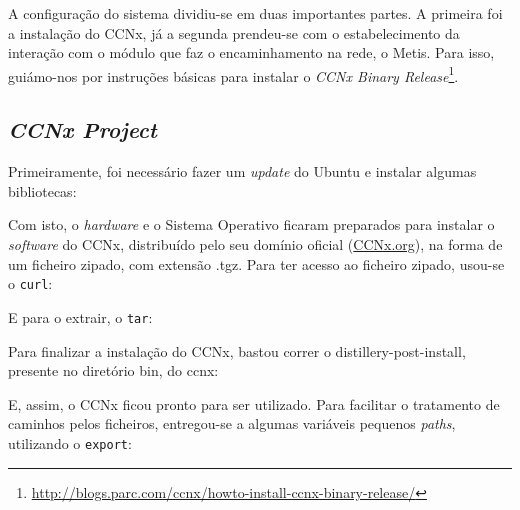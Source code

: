 \documentclass{report}
\begin{document}
A configuração do sistema dividiu-se em duas importantes partes. A primeira foi a instalação do CCNx, já a segunda prendeu-se com o estabelecimento da interação com o módulo que faz o encaminhamento na rede, o Metis. Para isso, guiámo-nos por instruções básicas para instalar o \textit{CCNx Binary Release}\footnote{\url{http://blogs.parc.com/ccnx/howto-install-ccnx-binary-release/}}.\\

\subsection{\textit{CCNx Project}}

Primeiramente, foi necessário fazer um \textit{update} do Ubuntu e instalar algumas bibliotecas:\\


Com isto, o \textit{hardware} e o Sistema Operativo ficaram preparados para instalar o \textit{software} do CCNx, distribuído pelo seu domínio oficial (\url{CCNx.org}), na forma de um ficheiro zipado, com extensão .tgz. Para ter acesso ao ficheiro zipado, usou-se o \texttt{curl}:\\


E para o extrair, o \texttt{tar}:\\


Para finalizar a instalação do CCNx, bastou correr o distillery-post-install, presente no diretório bin, do ccnx:\\


E, assim, o CCNx ficou pronto para ser utilizado. Para facilitar o tratamento de caminhos pelos ficheiros, entregou-se a algumas variáveis pequenos \textit{paths}, utilizando o \texttt{export}:\\
\end{document}
